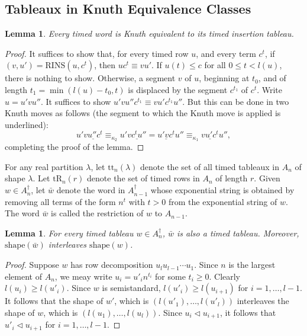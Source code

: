 \documentclass[10pt]{amsproc}
\newtheorem{lemma}[theorem]{Lemma}
\theoremstyle{definition}
\theoremstyle{remark}
\newcommand{\rowins}{\mathrm{RINS}}
\newcommand{\shape}{\mathrm{shape}}
\newcommand{\ttab}{\mathrm{tt}}
\newcommand{\tr}{\mathrm{tR}}
\begin{document}
\subsection{Tableaux in Knuth Equivalence Classes}
\label{sec:tabl-knuth-equiv}
\begin{lemma}
  \label{lemma:reduction-to-tab}
  Every timed word is Knuth equivalent to its timed insertion tableau.
\end{lemma}
\begin{proof}
  It suffices to show that, for every timed row $u$, and every term $c^t$, if $(v,u')=\rowins(u,c^t)$, then $uc^t\equiv vu'$.
  If $u(t)\leq c$ for all $0\leq t<l(u)$, there is nothing to show.
  Otherwise, a segment $v$ of $u$, beginning at $t_0$, and of length $t_1=\min(l(u)-t_0,t)$ is displaced by the segment $c^{t_1}$ of $c^t$.
  Write $u=u'vu''$.
  It suffices to show $u'vu''c^{t_1}\equiv vu'c^{t_1}u''$.
  But this can be done in two Knuth moves as follows (the segment to which the Knuth move is applied is underlined):
  \begin{displaymath}
    u'\underline{v u'' c^t} \equiv_{\kappa_2} u'\underline{vc^tu''} = \underline{u'vc^t}u'' \equiv_{\kappa_1} \underline{vu'c^t}u'',
  \end{displaymath}
  completing the proof of the lemma.
\end{proof}
For any real partition $\lambda$, let $\ttab_n(\lambda)$ denote the set of all timed tableaux in $A_n$ of shape $\lambda$.
Let $\tr_n(r)$ denote the set of timed rows in $A_n$ of length $r$.
Given $w\in A_n^\dagger$, let $\bar w$ denote the word in $A_{n-1}^\dagger$ whose exponential string is obtained by removing all terms of the form $n^t$ with $t>0$ from the exponential string of $w$.
The word $\bar w$ is called the restriction of $w$ to $A_{n-1}$.
\begin{lemma}
  \label{lemma:restriction-interleaf}
  For every timed tableau $w\in A_n^\dagger$, $\bar w$ is also a timed tableau. Moreover, $\shape(\bar w)$ interleaves $\shape(w)$.
\end{lemma}
\begin{proof}
  Suppose $w$ has row decomposition $u_lu_{l-1}\dotsb u_1$.
  Since $n$ is the largest element of $A_n$, we meay write $u_i=u'_in^{t_i}$ for some $t_i\geq 0$.
  Clearly $l(u_i)\geq l(u'_i)$.
  Since $w$ is semistandard, $l(u'_i)\geq l(u_{i+1})$ for $i=1,\dotsc,l-1$. 
  It follows that the shape of $w'$, which is $(l(u'_1),\dotsc,l(u'_l))$ interleaves the shape of $w$, which is $(l(u_1),\dotsc,l(u_l))$.
  Since $u_i\lhd u_{i+1}$, it follows that $u'_i\lhd u_{i+1}$ for $i=1,\dotsc,l-1$.
\end{proof}
\end{document}

